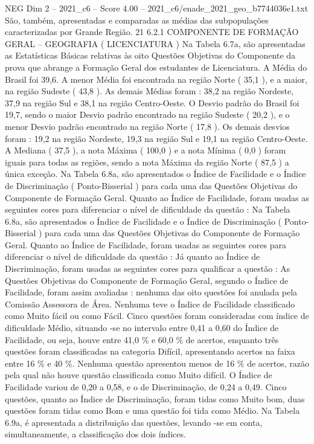 \begin{textsample}{NEG Dim 2 – 2021\_c6 – Score 4.00 – 2021\_c6/enade\_2021\_geo\_b7744036e1.txt}
São, também, apresentadas e comparadas as médias das subpopulações caracterizadas por Grande Região. 21 6.2.1 COMPONENTE DE FORMAÇÃO GERAL – GEOGRAFIA ( LICENCIATURA ) Na Tabela 6.7a, são apresentadas as Estatísticas Básicas relativas às oito Questões Objetivas do Componente da prova que abrange a Formação Geral dos estudantes de Licenciatura.
A Média do Brasil foi 39,6.
A menor Média foi encontrada na região Norte ( 35,1 ), e a maior, na região Sudeste ( 43,8 ).
As demais Médias foram : 38,2 na região Nordeste, 37,9 na região Sul e 38,1 na região Centro-Oeste.
O Desvio padrão do Brasil foi 19,7, sendo o maior Desvio padrão encontrado na região Sudeste ( 20,2 ), e o menor Desvio padrão encontrado na região Norte ( 17,8 ).
Os demais desvios foram : 19,2 na região Nordeste, 19,3 na região Sul e 19,1 na região Centro-Oeste.
A Mediana ( 37,5 ), a nota Máxima ( 100,0 ) e a nota Mínima ( 0,0 ) foram iguais para todas as regiões, sendo a nota Máxima da região Norte ( 87,5 ) a única exceção.
Na Tabela 6.8a, são apresentados o Índice de Facilidade e o Índice de Discriminação ( Ponto-Bisserial ) para cada uma das Questões Objetivas do Componente de Formação Geral.
Quanto ao Índice de Facilidade, foram usadas as seguintes cores para diferenciar o nível de dificuldade da questão : Na Tabela 6.8a, são apresentados o Índice de Facilidade e o Índice de Discriminação ( Ponto-Bisserial ) para cada uma das Questões Objetivas do Componente de Formação Geral.
Quanto ao Índice de Facilidade, foram usadas as seguintes cores para diferenciar o nível de dificuldade da questão : Já quanto ao Índice de Discriminação, foram usadas as seguintes cores para qualificar a questão : As Questões Objetivas do Componente de Formação Geral, segundo o Índice de Facilidade, foram assim avaliadas : nenhuma das oito questões foi anulada pela Comissão Assessora de Área.
Nenhuma teve o Índice de Facilidade classificado como Muito fácil ou como Fácil.
Cinco questões foram consideradas com índice de dificuldade Médio, situando -se no intervalo entre 0,41 a 0,60 do Índice de Facilidade, ou seja, houve entre 41,0 \% e 60,0 \% de acertos, enquanto três questões foram classificadas na categoria Difícil, apresentando acertos na faixa entre 16 \% e 40 \%.
Nenhuma questão apresentou menos de 16 \% de acertos, razão pela qual não houve questão classificada como Muito difícil.
O Índice de Facilidade variou de 0,20 a 0,58, e o de Discriminação, de 0,24 a 0,49.
Cinco questões, quanto ao Índice de Discriminação, foram tidas como Muito bom, duas questões foram tidas como Bom e uma questão foi tida como Médio.
Na Tabela 6.9a, é apresentada a distribuição das questões, levando -se em conta, simultaneamente, a classificação dos dois índices.

\end{textsample}
